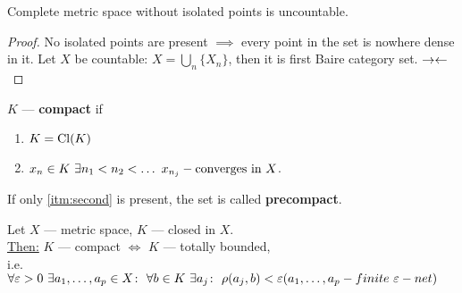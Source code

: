 \begin{cor}
  Complete metric space without isolated points is uncountable.
\end{cor}

\begin{proof}
  No isolated points are present $\implies$ every point in the set is nowhere dense in it. Let $X$ be countable:
    $X = \bigcup\limits_n \{X_n\}$, then it is first Baire category set. $\rightarrow\leftarrow$
\end{proof}

\begin{defn}
  $K$ --- \textbf{compact} if
  \begin{enumerate}
    \item $K = \operatorname{Cl}({K})$
    \item \label{itm:second}$x_n \in K\ \exists n_1 < n_2 < \dotso\ x_{n_j} - \textnormal{converges in $X$}$.
  \end{enumerate}
  If only \ref{itm:second} is present, the set is called \textbf{precompact}.
\end{defn}

\begin{thm}[Hausdorff]
  Let $X$ --- metric space, $K$ --- closed in $X$. \\
  \underline{Then:} $K$ --- compact $\iff$ $K$ --- totally bounded, \\
  i.e. $\forall \epsilon > 0\ \exists a_1,\dotsc, a_p \in X \colon\ \forall b \in K\ \exists a_j \colon\ \rho(a_j, b) < \epsilon \\
  (a_1, \dotsc, a_p - finite\ \epsilon-net)$
\end{thm}

